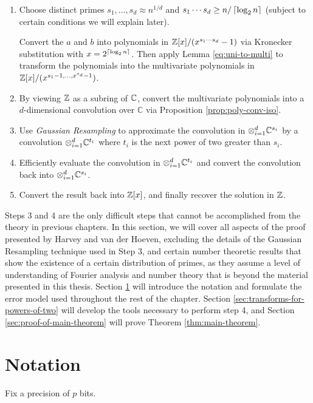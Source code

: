 \begin{enumerate}
    \item  Choose distinct primes $s_1, \ldots, s_d \approx n^{1/d}$ and $s_1\cdots s_d \ge n/\left \lceil \log_2 n \right \rceil$ (subject to certain conditions we will explain later).

        Convert the $a$ and $b$ into polynomials in ${\mathbb Z}[x]/(x^{s_1\cdots s_d} - 1)$ via Kronecker substitution with $x = 2^{\left \lceil \log_2 n \right \rceil}$. Then apply Lemma \ref{eq:uni-to-multi} to transform the polynomials into the multivariate polynomials in ${\mathbb Z}[x]/(x^{s_1 - 1, \ldots, x^{s_d} - 1})$.
    \item By viewing ${\mathbb Z}$ as a subring of ${\mathbb C}$, convert the multivariate polynomials into a $d$-dimensional convolution over $\mathbb{C}$ via Proposition \ref{prop:poly-conv-iso}.
    \item Use \emph{Gaussian Resampling} to approximate the convolution in $\otimes_{i=1}^d {\mathbb C}^{s_i}$ by a convolution $\otimes_{i=1}^d {\mathbb C}^{t_i}$ where $t_i$ is the next power of two greater than $s_i$.
    \item Efficiently evaluate the convolution in $\otimes_{i=1}^d {\mathbb C}^{t_i}$ and convert the convolution back into $\otimes_{i=1}^d {\mathbb C}^{s_i}$.
    \item Convert the result back into ${\mathbb Z}[x]$, and finally recover the solution in ${\mathbb Z}$.
\end{enumerate}

Steps 3 and 4 are the only difficult steps that cannot be accomplished from the theory in previous chapters. In this section, we will cover all aspects of the proof presented by Harvey and van der Hoeven, excluding the details of the Gaussian Resampling technique used in Step 3, and certain number theoretic results that show the existence of a certain distribution of primes, as they assume a level of understanding of Fourier analysis and number theory that is beyond the material presented in this thesis. Section \ref{sec:notation} will introduce the notation and formulate the error model used throughout the rest of the chapter. Section \ref{sec:transforms-for-powers-of-two} will develop the tools necessary to perform step 4, and Section \ref{sec:proof-of-main-theorem} will prove Theorem \ref{thm:main-theorem}.

\section{Notation}%
\label{sec:notation}

Fix a precision of $p$ bits.

